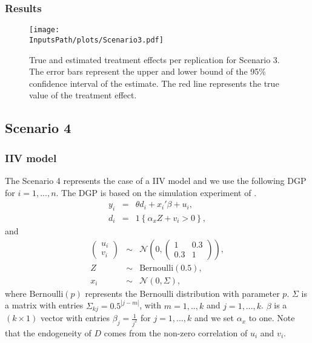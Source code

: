 \documentclass[10pt]{article}
\newcommand*{\InputsFolderPath}{C:/DEV/DML/src/data/}
\newcommand*{\InputsPath}{\InputsFolderPath/20221103}
\begin{document}
\subsubsection{Results}
\begin{figure}[H]
	\begin{center}
		\texttt{[image: \\InputsPath/plots/Scenario3.pdf]}
		\caption{True and estimated treatment effects per replication for Scenario 3. The error bars represent the upper and lower bound of the 95\% confidence interval of the estimate. The red line represents the true value of the treatment effect.}
		\label{Scenario3}
	\end{center}
\end{figure}



\subsection{Scenario 4}
\subsubsection{IIV model}
The Scenario 4 represents the case of a IIV model and we use the following DGP for $i=1,...,n$.
The DGP is based on the simulation experiment of \cite{Farb2020}.
\begin{eqnarray*}\label{dgp_4.1}
y_i &=& \theta d_i + x_i' \beta + u_i, \\	
d_i &=& 1\left\lbrace \alpha_x Z + v_i > 0 \right\rbrace,
\end{eqnarray*}
and
\begin{eqnarray*}\label{dgp_4.2}
\left(\begin{matrix} u_i \\ v_i \end{matrix} \right) &\sim&
\mathcal{N}\left(0, \left(\begin{matrix} 1 & 0.3 \\ 0.3 & 1 \end{matrix} \right) \right), \\
Z &\sim& \text{Bernoulli}(0.5), \\
x_i &\sim& \mathcal{N}(0, \Sigma),
\end{eqnarray*}
where $\text{Bernoulli}(p)$ represents the Bernoulli distribution with parameter $p$. 
$\Sigma$ is a matrix with entries $\Sigma_{kj} = 0.5^{|j-m|}$, with $m=1,..,k$ and $j=1,...,k$.
$\beta$ is a $(k \times 1)$ vector with entries $\beta_j=\frac{1}{j^2}$ for $j=1,...,k$ and we set $\alpha_x$ to one.
Note that the endogeneity of $D$ comes from the non-zero correlation of $u_i$ and $v_i$.
\end{document}
